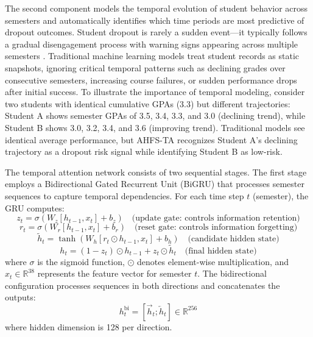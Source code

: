 \documentclass[journal]{IEEEtran}
\begin{document}
The second component models the temporal evolution of student behavior across semesters and automatically identifies which time periods are most predictive of dropout outcomes. Student dropout is rarely a sudden event---it typically follows a gradual disengagement process with warning signs appearing across multiple semesters \cite{tan2025student}. Traditional machine learning models treat student records as static snapshots, ignoring critical temporal patterns such as declining grades over consecutive semesters, increasing course failures, or sudden performance drops after initial success. To illustrate the importance of temporal modeling, consider two students with identical cumulative GPAs (3.3) but different trajectories: Student A shows semester GPAs of 3.5, 3.4, 3.3, and 3.0 (declining trend), while Student B shows 3.0, 3.2, 3.4, and 3.6 (improving trend). Traditional models see identical average performance, but AHFS-TA recognizes Student A's declining trajectory as a dropout risk signal while identifying Student B as low-risk.

The temporal attention network consists of two sequential stages. The first stage employs a Bidirectional Gated Recurrent Unit (BiGRU) that processes semester sequences to capture temporal dependencies. For each time step $t$ (semester), the GRU computes:
\begin{equation}
z_t = \sigma(W_z [h_{t-1}, x_t] + b_z) \quad \text{(update gate: controls information retention)}
\end{equation}
\begin{equation}
r_t = \sigma(W_r [h_{t-1}, x_t] + b_r) \quad \text{(reset gate: controls information forgetting)}
\end{equation}
\begin{equation}
\tilde{h}_t = \tanh(W_h [r_t \odot h_{t-1}, x_t] + b_h) \quad \text{(candidate hidden state)}
\end{equation}
\begin{equation}
h_t = (1 - z_t) \odot h_{t-1} + z_t \odot \tilde{h}_t \quad \text{(final hidden state)}
\end{equation}
where $\sigma$ is the sigmoid function, $\odot$ denotes element-wise multiplication, and $x_t \in \mathbb{R}^{38}$ represents the feature vector for semester $t$. The bidirectional configuration processes sequences in both directions and concatenates the outputs:
\begin{equation}
h_t^{\text{bi}} = [\overrightarrow{h}_t; \overleftarrow{h}_t] \in \mathbb{R}^{256}
\end{equation}
where hidden dimension is 128 per direction.
\end{document}
